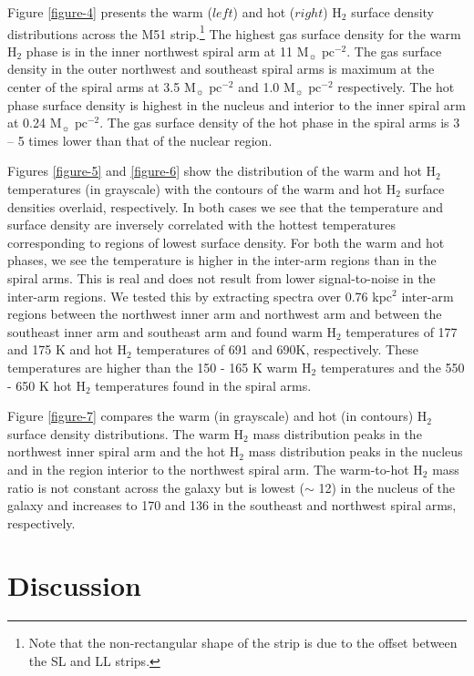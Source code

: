 \documentclass[manuscript]{aastex}
\begin{document}
Figure \ref{figure-4} presents the warm ($left$) and hot ($right$)
H$_2$ surface density distributions across the M51 
strip.\footnote{Note that the non-rectangular shape of the strip 
is due to the offset between the SL and LL strips.}  The highest 
gas surface density for the warm H$_2$ phase is in 
the inner northwest spiral arm at 11 $\mathrm{M_\sun}$ 
$\mathrm{pc^{-2}}$. The gas surface density in the outer 
northwest and southeast spiral arms is maximum at the 
center of the spiral arms at 3.5 $\mathrm{M_\sun}$ 
$\mathrm{pc^{-2}}$ and 1.0 $\mathrm{M_\sun}$ $\mathrm{pc^{-2}}$ 
respectively.  The hot phase surface density is highest in 
the nucleus and interior to the inner spiral arm at 0.24 
$\mathrm{M_\sun}$ $\mathrm{pc^{-2}}$.  The gas surface 
density of the hot phase in the spiral arms is 3 -- 5 times 
lower than that of the nuclear region.

Figures \ref{figure-5} and \ref{figure-6} show the distribution 
of the warm and hot H$_2$ temperatures (in grayscale) with 
the contours of the warm and hot H$_2$ surface densities overlaid, respectively.  In 
both cases we see that the temperature and surface density 
are inversely correlated with the hottest temperatures 
corresponding to regions of lowest surface density.  For 
both the warm and hot phases, we see the temperature 
is higher in the inter-arm regions than in the spiral arms. 
This is real and does not result from lower signal-to-noise 
in the inter-arm regions.   We tested this by extracting spectra 
over 0.76 kpc$^2$ inter-arm regions between the northwest inner arm and northwest 
arm and between the southeast inner arm and southeast arm and found warm H$_2$ 
temperatures of 177 and 175 K and hot H$_2$ temperatures 
of 691 and 690K, respectively.  These temperatures are higher 
than the 150 - 165 K warm H$_2$ temperatures and the 550 - 650 
K hot H$_2$ temperatures found in the spiral arms.

Figure \ref{figure-7} compares the warm (in grayscale) 
and hot (in contours) H$_2$ surface density distributions.   
The warm H$_2$ mass distribution peaks
in the northwest inner spiral arm and the hot H$_2$ 
mass distribution peaks in the nucleus and in the 
region interior to the northwest spiral arm.  The warm-to-hot 
H$_2$ mass ratio is not constant across 
the galaxy but is lowest ($\sim$ 12) in the nucleus of the 
galaxy and increases to 170 and 136 in the southeast 
and northwest spiral arms, respectively.

\section{Discussion}
\end{document}
